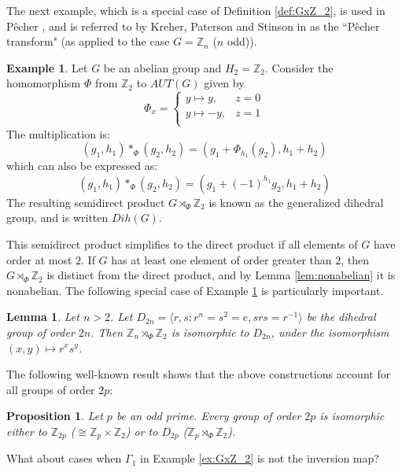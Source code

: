 \documentclass[12pt, a4paper]{article}
\newtheorem{proposition}[theorem]{Proposition}
\newtheorem{lemma}[theorem]{Lemma}
\theoremstyle{definition}
\newtheorem{example}[theorem]{Example}
\begin{document}
The next example, which is a special case of Definition \ref{def:GxZ_2}, is used in P\^{e}cher \cite{Pec}, and is referred to by Kreher, Paterson and Stinson in \cite{KrePatSti} as the ``P\^{e}cher transform" (as applied to the case $G=\mathbb{Z}_{n}$ ($n$ odd)).

\begin{example}\label{def:dihedral}
Let $G$ be an abelian group and $H_2=\mathbb{Z}_2$.  Consider the homomorphism $\Phi$ from $\mathbb{Z}_2$ to $AUT(G)$ given by
    \[
    \Phi_x = \begin{cases} 
           y \mapsto y, & z=0 \\
           y \mapsto -y, & z=1\\
    \end{cases}
    \]
The multiplication is:
\[ (g_1,h_1)*_{\Phi}(g_2,h_2)=(g_1+\Phi_{h_1}(g_2),h_1+h_2)\]
which can also be expressed as:
\[ (g_1,h_1)*_{\Phi}(g_2,h_2)=(g_1+(-1)^{h_1}g_2,h_1+h_2)\]
The resulting semidirect product $G \rtimes_\Phi \mathbb{Z}_2$ is known as the generalized dihedral group, and is written $Dih(G)$. 
\end{example}

This semidirect product simplifies to the direct product if all elements of $G$ have order at most $2$.  If $G$ has at least one element of order greater than $2$, then $G \rtimes_{\Phi} \mathbb{Z}_2$ is distinct from the direct product, and by Lemma \ref{lem:nonabelian} it is nonabelian.
The following special case of Example \ref{def:dihedral} is particularly important.
\begin{lemma}\label{lem:dihedraldef}
Let $n>2$. Let $D_{2n}=\langle r,s: r^n=s^2=e, srs=r^{-1} \rangle$ be the dihedral group of order $2n$. Then $\mathbb{Z}_n \rtimes_\Phi \mathbb{Z}_2$ is isomorphic to $D_{2n}$, under the isomorphism $(x,y) \mapsto r^x s^y$.
\end{lemma}

The following well-known result shows that the above constructions account for all groups of order $2p$:
\begin{proposition}
Let $p$ be an odd prime. Every group of order $2p$ is isomorphic either to $\mathbb{Z}_{2p}$ ($\cong \mathbb{Z}_p \times \mathbb{Z}_2$) or to $D_{2p}$ ($\mathbb{Z}_p \rtimes_{\Phi} \mathbb{Z}_2$).
\end{proposition}

What about cases when $\Gamma_1$ in Example \ref{ex:GxZ_2} is not the inversion map?
\end{document}
